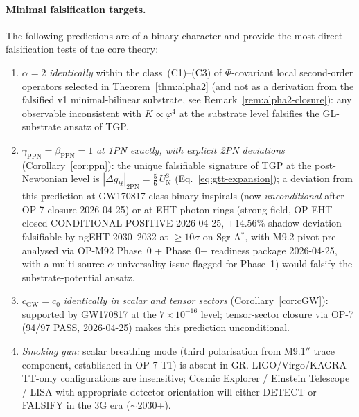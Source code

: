 \documentclass[11pt,a4paper]{article}
\renewcommand{\Phi}{\varPhi}
\begin{document}
\paragraph{Minimal falsification targets.} The following predictions are
of a binary character and provide the most direct falsification tests of
the core theory:
\begin{enumerate}[(F1),nosep]
  \item $\alpha=2$ \emph{identically} within the class~(C1)--(C3)
    of $\Phi$-covariant local second-order operators selected in
    Theorem~\ref{thm:alpha2} (and not as a derivation from the
    falsified v1 minimal-bilinear substrate, see
    Remark~\ref{rem:alpha2-closure}): any observable inconsistent
    with $K\propto\varphi^{4}$ at the substrate level falsifies the
    GL-substrate ansatz of TGP.
  \item $\gamma_{\mathrm{PPN}}=\beta_{\mathrm{PPN}}=1$ \emph{at 1PN
    exactly, with explicit 2PN deviations}
    (Corollary~\ref{cor:ppn}): the unique falsifiable signature of TGP
    at the post-Newtonian level is
    $|\Delta g_{tt}|_{2\mathrm{PN}}=\tfrac{5}{6}\,U_{\mathrm{N}}^{3}$
    (Eq.~\eqref{eq:gtt-expansion}); a deviation from this prediction at
    GW170817-class binary inspirals (now \emph{unconditional} after
    OP-7 closure 2026-04-25) or at EHT photon rings (strong field,
    OP-EHT closed CONDITIONAL POSITIVE 2026-04-25, $+14.56\%$ shadow
    deviation falsifiable by ngEHT 2030--2032 at $\geq 10\sigma$ on
    Sgr A$^*$, with M9.2 pivot pre-analysed via OP-M92 Phase~0
    + Phase~0+ readiness package 2026-04-25, with a multi-source
    $\alpha$-universality issue flagged for Phase~1) would falsify
    the substrate-potential
    ansatz.
  \item $c_{\mathrm{GW}}=c_{0}$ \emph{identically in scalar and
    tensor sectors} (Corollary~\ref{cor:cGW}): supported by GW170817
    at the $7 \times 10^{-16}$ level; tensor-sector closure via
    OP-7 (94/97 PASS, 2026-04-25) makes this prediction unconditional.
  \item \emph{Smoking gun:} scalar breathing mode (third polarisation
    from M9.1$''$ trace component, established in OP-7 T1) is absent in
    GR. LIGO/Virgo/KAGRA TT-only configurations are insensitive;
    Cosmic Explorer / Einstein Telescope / LISA with appropriate
    detector orientation will either DETECT or FALSIFY in the 3G era
    ($\sim 2030$+).
\end{enumerate}
\end{document}
